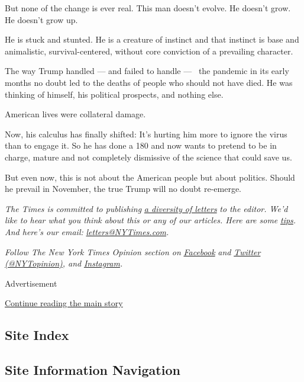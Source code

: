 But none of the change is ever real. This man doesn't evolve. He doesn't
grow. He doesn't grow up.

He is stuck and stunted. He is a creature of instinct and that instinct
is base and animalistic, survival-centered, without core conviction of a
prevailing character.

The way Trump handled --- and failed to handle ---~ the pandemic in its
early months no doubt led to the deaths of people who should not have
died. He was thinking of himself, his political prospects, and nothing
else.

American lives were collateral damage.

Now, his calculus has finally shifted: It's hurting him more to ignore
the virus than to engage it. So he has done a 180 and now wants to
pretend to be in charge, mature and not completely dismissive of the
science that could save us.

But even now, this is not about the American people but about politics.
Should he prevail in November, the true Trump will no doubt re-emerge.

\emph{The Times is committed to publishing}
\href{https://www.nytimes3xbfgragh.onion/2019/01/31/opinion/letters/letters-to-editor-new-york-times-women.html}{\emph{a
diversity of letters}} \emph{to the editor. We'd like to hear what you
think about this or any of our articles. Here are some}
\href{https://help.nytimes3xbfgragh.onion/hc/en-us/articles/115014925288-How-to-submit-a-letter-to-the-editor}{\emph{tips}}\emph{.
And here's our email:}
\href{mailto:letters@NYTimes.com}{\emph{letters@NYTimes.com}}\emph{.}

\emph{Follow The New York Times Opinion section on}
\href{https://www.facebookcorewwwi.onion/nytopinion}{\emph{Facebook}}
\emph{and} \href{http://twitter.com/NYTOpinion}{\emph{Twitter
(@NYTopinion)}}\emph{, and}
\href{https://www.instagram.com/nytopinion/}{\emph{Instagram}}\emph{.}

Advertisement

\protect\hyperlink{after-bottom}{Continue reading the main story}

\hypertarget{site-index}{%
\subsection{Site Index}\label{site-index}}

\hypertarget{site-information-navigation}{%
\subsection{Site Information
Navigation}\label{site-information-navigation}}

